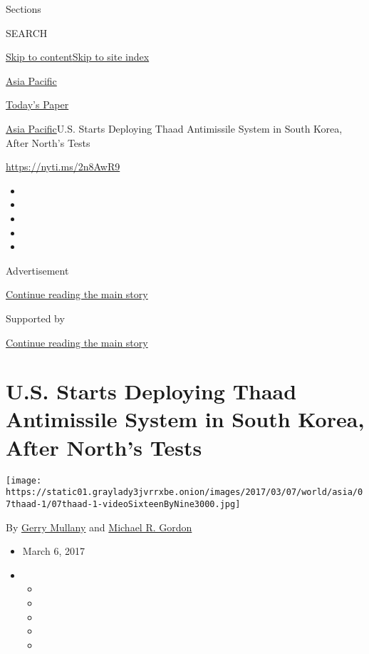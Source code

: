 Sections

SEARCH

\protect\hyperlink{site-content}{Skip to
content}\protect\hyperlink{site-index}{Skip to site index}

\href{https://www.nytimes3xbfgragh.onion/section/world/asia}{Asia
Pacific}

\href{https://myaccount.nytimes3xbfgragh.onion/auth/login?response_type=cookie\&client_id=vi}{}

\href{https://www.nytimes3xbfgragh.onion/section/todayspaper}{Today's
Paper}

\href{/section/world/asia}{Asia Pacific}\textbar{}U.S. Starts Deploying
Thaad Antimissile System in South Korea, After North's Tests

\url{https://nyti.ms/2n8AwR9}

\begin{itemize}
\item
\item
\item
\item
\item
\end{itemize}

Advertisement

\protect\hyperlink{after-top}{Continue reading the main story}

Supported by

\protect\hyperlink{after-sponsor}{Continue reading the main story}

\hypertarget{us-starts-deploying-thaad-antimissile-system-in-south-korea-after-norths-tests}{%
\section{U.S. Starts Deploying Thaad Antimissile System in South Korea,
After North's
Tests}\label{us-starts-deploying-thaad-antimissile-system-in-south-korea-after-norths-tests}}

\texttt{[image: https://static01.graylady3jvrrxbe.onion/images/2017/03/07/world/asia/07thaad-1/07thaad-1-videoSixteenByNine3000.jpg]}

By \href{http://www.nytimes3xbfgragh.onion/by/gerry-mullany}{Gerry
Mullany} and
\href{http://www.nytimes3xbfgragh.onion/by/michael-r-gordon}{Michael R.
Gordon}

\begin{itemize}
\item
  March 6, 2017
\item
  \begin{itemize}
  \item
  \item
  \item
  \item
  \item
  \end{itemize}
\end{itemize}

